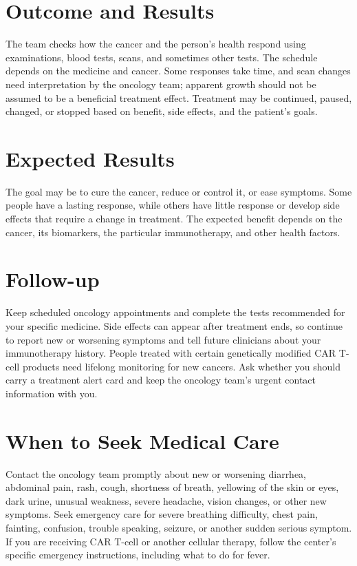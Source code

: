 \section*{Outcome and Results}
The team checks how the cancer and the person's health respond using examinations, blood tests, scans, and sometimes other tests. The schedule depends on the medicine and cancer. Some responses take time, and scan changes need interpretation by the oncology team; apparent growth should not be assumed to be a beneficial treatment effect. Treatment may be continued, paused, changed, or stopped based on benefit, side effects, and the patient's goals.

\section*{Expected Results}
The goal may be to cure the cancer, reduce or control it, or ease symptoms. Some people have a lasting response, while others have little response or develop side effects that require a change in treatment. The expected benefit depends on the cancer, its biomarkers, the particular immunotherapy, and other health factors.

\section*{Follow-up}
Keep scheduled oncology appointments and complete the tests recommended for your specific medicine. Side effects can appear after treatment ends, so continue to report new or worsening symptoms and tell future clinicians about your immunotherapy history. People treated with certain genetically modified CAR T-cell products need lifelong monitoring for new cancers. Ask whether you should carry a treatment alert card and keep the oncology team's urgent contact information with you.

\section*{When to Seek Medical Care}
Contact the oncology team promptly about new or worsening diarrhea, abdominal pain, rash, cough, shortness of breath, yellowing of the skin or eyes, dark urine, unusual weakness, severe headache, vision changes, or other new symptoms. Seek emergency care for severe breathing difficulty, chest pain, fainting, confusion, trouble speaking, seizure, or another sudden serious symptom. If you are receiving CAR T-cell or another cellular therapy, follow the center's specific emergency instructions, including what to do for fever.

